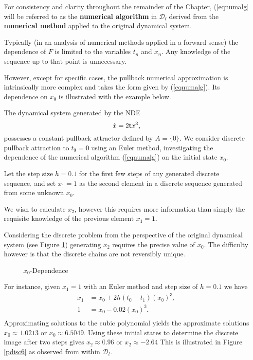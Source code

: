 For consistency and clarity throughout the remainder of the Chapter,
(\ref{eqnumalg} will be referred to as the \textbf{numerical algorithm} in
$\mathcal{D}_l$ derived from the \textbf{numerical method} applied to the
original dynamical system.

Typically (in an analysis of numerical methods applied in a forward sense) the
dependence of $F$ is limited to the variables $t_n$ and $x_n$. Any knowledge of
the sequence up to that point is unnecessary.

However, except for specific cases, the pullback numerical approximation is
intrinsically more complex and takes the form given by (\ref{eqnumalg}).
Its dependence on $x_0$ is illustrated with the example below.


\begin{eg}
The dynamical system generated by the NDE
\[ \dot{x} = 2  \mathsf{\mathsf{t}} x^3, \]
possesses a constant pullback attractor defined by $A = \{ 0 \}$. We
consider discrete pullback attraction to $t_0 = 0$ using an Euler method,
investigating the dependence of the numerical algorithm (\ref{eqnumalg}) on the
initial state $x_0$.

Let the step size $h = 0.1$ for the first few steps of any
generated discrete sequence, and set $x_1 = 1$ as the second
element in a discrete sequence generated from some unknown $x_0$.

We wish to calculate $x_2$, however this requires more information than simply
the requisite knowledge of the previous element $x_1 = 1$.

Considering the discrete problem from the perspective of the original dynamical
system (see Figure \ref{pdisc5}) generating $x_2$ requires the precise value of
$x_0$. The difficulty however is that the discrete chains are not
reversibly unique.

\begin{figure}[h]
\begin{center}
 \caption{$x_0$-Dependence}
\protect\label{pdisc5}
\end{center}
\end{figure}

For instance, given $x_1 = 1$ with an Euler method and step size of $h = 0.1$ we
have
\begin{align*}
  x_1 &= x_0 + 2 h(t_0 - t_1) (x_0)^3, \\
   1    &= x_0 - 0.02 (x_0)^3. \\
\end{align*}
Approximating solutions to the cubic polynomial yields the
approximate solutions $x_0 \approx 1.0213$ or $x_0 \approx
6.5049$. Using these initial states to determine the discrete
image after two steps gives $x_2 \approx 0.96$ or $x_2 \approx
-2.64$ This is illustrated in Figure \ref{pdisc6} as observed from
within $\mathcal{D}_l$.


\end{eg}
